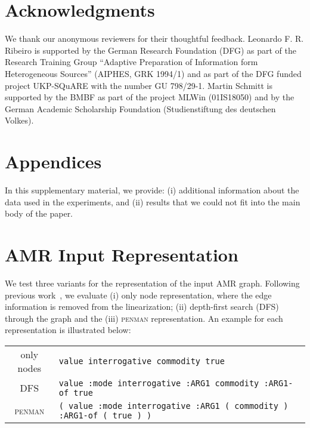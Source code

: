 \documentclass[11pt]{article}
\begin{document}
\begin{table}[t]
\section*{Acknowledgments}
We thank our anonymous reviewers for their thoughtful feedback. Leonardo F. R. Ribeiro is supported by the German Research Foundation (DFG) as part of the Research Training Group ``Adaptive Preparation of Information form Heterogeneous Sources'' (AIPHES, GRK 1994/1) and as part of the DFG funded project UKP-SQuARE with the number GU 798/29-1. Martin Schmitt is supported by the BMBF as part of the project MLWin (01IS18050) and by the German Academic Scholarship Foundation (Studienstiftung des deutschen Volkes).







\clearpage

\appendix

\section*{Appendices}

In this supplementary material, we provide: (i) additional information about the data used in the experiments, and (ii) results that we could not fit into the main body of the paper.

\section{AMR Input Representation}
\label{sec:amrinput}
We test three variants for the representation of the input AMR graph. Following previous work~\cite{konsas_17, mager2020gpttoo}, we evaluate (i) only node representation, where the edge information is removed from the linearization; (ii) depth-first search (DFS) through the graph and the (iii) \textsc{penman} representation. An example for each representation is illustrated below: 
\begin{table}[h]
\begin{tabular}{c p{5.5cm}}
\vspace{3mm}
\small only nodes   & \small \texttt{value interrogative commodity true}\\
\small DFS     & \small \texttt{value :mode interrogative :ARG1 commodity :ARG1-of true} \\
\small \textsc{penman}     & \small \texttt{( value :mode interrogative :ARG1 ( commodity ) :ARG1-of ( true ) )}
\end{tabular}
\end{table}


\end{table}
\end{document}
